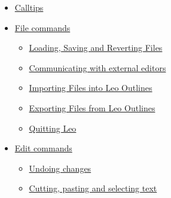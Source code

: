 \documentclass[a4paper,10pt,english]{sphinxmanual}
\begin{document}
{\begin{minipage}{0.95\linewidth}
\begin{itemize}
\begin{itemize}
\begin{itemize}
\item {} 
{\hyperref[commands:using-the-qcompleter]{Using the QCompleter}}

\item {} 
{\hyperref[commands:using-the-log-pane-completer]{Using the Log pane completer}}

\item {} 
{\hyperref[commands:showing-docstrings]{Showing docstrings}}

\item {} 
{\hyperref[commands:autocompleter-settings]{Autocompleter settings}}

\item {} 
{\hyperref[commands:creating-ctags-data]{Creating ctags data}}

\end{itemize}

\item {} 
{\hyperref[commands:calltips]{Calltips}}

\item {} 
{\hyperref[commands:file-commands]{File commands}}
\begin{itemize}
\item {} 
{\hyperref[commands:loading-saving-and-reverting-files]{Loading, Saving and Reverting Files}}

\item {} 
{\hyperref[commands:communicating-with-external-editors]{Communicating with external editors}}

\item {} 
{\hyperref[commands:importing-files-into-leo-outlines]{Importing Files into Leo Outlines}}

\item {} 
{\hyperref[commands:exporting-files-from-leo-outlines]{Exporting Files from Leo Outlines}}

\item {} 
{\hyperref[commands:quitting-leo]{Quitting Leo}}

\end{itemize}

\item {} 
{\hyperref[commands:edit-commands]{Edit commands}}
\begin{itemize}
\item {} 
{\hyperref[commands:undoing-changes]{Undoing changes}}

\item {} 
{\hyperref[commands:cutting-pasting-and-selecting-text]{Cutting, pasting and selecting text}}


\end{itemize}
\end{itemize}
\end{itemize}
\end{minipage}}
\end{document}
